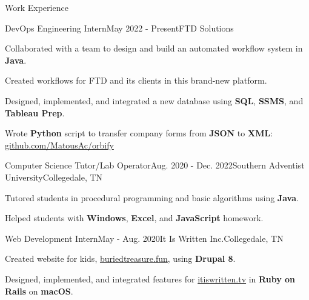 \begin{rSection}{Work Experience}
  \begin{job}{DevOps Engineering Intern}{May 2022 - Present}{FTD Solutions}{}
    \item Collaborated with a team to design and build an automated workflow system in {\bf Java}.
    \item Created workflows for FTD and its clients in this brand-new platform.
    \item Designed, implemented, and integrated a new database using {\bf SQL}, {\bf SSMS}, and {\bf Tableau Prep}.
    \item Wrote {\bf Python} script to transfer company forms from {\bf JSON} to {\bf XML}: \href{https://github.com/MatousAc/orbify}{github.com/MatousAc/orbify}
  \end{job}

  \begin{job}{Computer Science Tutor/Lab Operator}{Aug. 2020 - Dec. 2022}{Southern Adventist University}{Collegedale, TN}{}
    \item Tutored students in procedural programming and basic algorithms using {\bf Java}.
    \item Helped students with {\bf Windows}, {\bf Excel}, and {\bf JavaScript} homework.
  \end{job}


  \begin{job}{Web Development Intern}{May - Aug. 2020}{It Is Written Inc.}{Collegedale, TN}
    \item Created website for kids, \href{https://buriedtreasure.fun/}{buriedtreasure.fun}, using {\bf Drupal 8}.
    \item Designed, implemented, and integrated features for \href{https://itiswritten.tv}{itiswritten.tv} in {\bf Ruby on Rails} on {\bf macOS}.
  \end{job}
\end{rSection}
